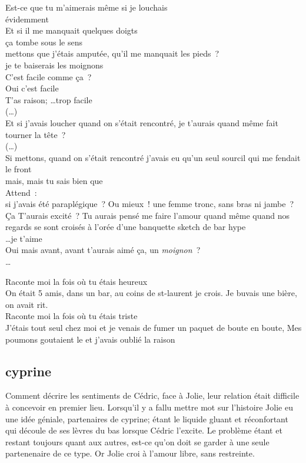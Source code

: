 \documentclass{article}
\begin{document}
Est-ce que tu m’aimerais même si je louchais\\
évidemment\\
Et si il me manquait quelques doigts\\
ça tombe sous le sens\\
mettons que j’étais amputée, qu’il me manquait les pieds ?\\
je te baiserais les moignons\\
C’est facile comme ça ?\\
Oui c’est facile\\
T’as raison; \ldots trop facile\\
(…)\\
Et si j’avais loucher quand on s’était rencontré, je t’aurais quand même fait tourner la tête ?\\
(…)\\
Si mettons, quand on s’était rencontré j'avais eu qu’un seul sourcil qui me
fendait le front\\
mais, mais tu sais bien que\\
Attend :\\
si j’avais été paraplégique ? Ou mieux ! une femme tronc, sans bras ni
jambe ? Ça T’aurais excité ? Tu aurais pensé me faire l’amour quand même quand
nos regards se sont croisés à l’orée d’une banquette sketch de bar hype\\

\ldots je t’aime\\
Oui mais avant, avant t’aurais aimé ça, un \textit{moignon} ? \\

\ldots

Raconte moi la fois où tu étais heureux\\
On était 5 amis, dans un bar, au coins de st-laurent je crois.
Je buvais une bière, on avait rit.\\
Raconte moi la fois où tu étais triste\\
J'étais tout seul chez moi et je venais de fumer
un paquet de boute en boute, Mes poumons goutaient le
et j'avais oublié la raison
\clearpage

\subsection{cyprine}

Comment décrire les sentiments de Cédric, face à Jolie, leur relation était
difficile à concevoir en premier lieu. Lorsqu'il y a fallu mettre mot sur
l'histoire Jolie eu une idée géniale, partenaires de cyprine; étant le liquide
gluant et réconfortant qui découle de ses lèvres du bas lorsque Cédric l'excite.
Le problème étant et restant toujours quant aux autres, est-ce qu'on doit se
garder à une seule partenenaire de ce type. Or Jolie croi à l'amour libre, sans
restreinte.\\
\end{document}
